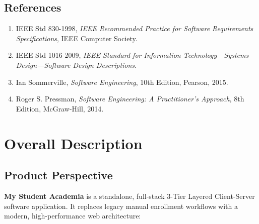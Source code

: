 \documentclass[a4paper,12pt]{article}
\begin{document}
\subsection{References}
\begin{enumerate}[leftmargin=1.2cm]
    \item IEEE Std 830-1998, \textit{IEEE Recommended Practice for Software Requirements Specifications}, IEEE Computer Society.
    \item IEEE Std 1016-2009, \textit{IEEE Standard for Information Technology---Systems Design---Software Design Descriptions}.
    \item Ian Sommerville, \textit{Software Engineering}, 10th Edition, Pearson, 2015.
    \item Roger S. Pressman, \textit{Software Engineering: A Practitioner's Approach}, 8th Edition, McGraw-Hill, 2014.
\end{enumerate}

\section{Overall Description}

\subsection{Product Perspective}
\textbf{My Student Academia} is a standalone, full-stack 3-Tier Layered Client-Server software application. It replaces legacy manual enrollment workflows with a modern, high-performance web architecture:
\end{document}

